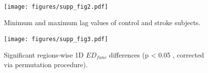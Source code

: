 \documentclass[fleqn,10pt]{wlscirep}
\begin{document}
\begin{figure}[b]
\centering
\texttt{[image: figures/supp\_fig2.pdf]}
\caption{\label{fig:lags_hist}  Minimum and maximum lag values of control and stroke subjects.}
\end{figure}

\begin{figure}[b]
\centering
\texttt{[image: figures/supp\_fig3.pdf]}
\caption{\label{fig:1d_edfunc}  Significant regions-wise 1D $\textit{ED}_{{func}}$ differences (p < 0.05 , corrected via permutation
procedure).}
\end{figure}
\end{document}
